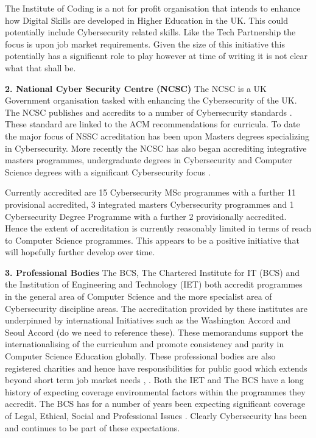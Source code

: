 \documentclass[sigconf]{acmart}
\begin{document}
The Institute of Coding is a not for profit organisation that intends to enhance how Digital Skills are developed in Higher Education in the UK. This could potentially include Cybersecurity related skills. Like the Tech Partnership the focus is upon job market requirements.  Given the size of this initiative this potentially has a significant role to play however at time of writing it is not clear what that shall be.

\textbf{2. National Cyber Security Centre (NCSC)}
The NCSC is a UK Government organisation tasked with enhancing the Cybersecurity of the UK. The NCSC publishes and accredits to a number of Cybersecurity standards \cite{NCCS2018a}. These standard are linked to the ACM recommendations for curricula. To date the major focus of NSSC acreditation has been upon Masters degrees specializing in Cybersecurity. More recently the NCSC has also began accrediting integrative masters programmes, undergraduate degrees in Cybersecurity and Computer Science degrees with a significant Cybersecurity focus \cite{NCCS2018b}.

Currently accredited are 15 Cybersecurity MSc programmes with a further 11 provisional accredited, 3 integrated masters Cybersecurity programmes and 1 Cybersecurity Degree Programme with a further 2 provisionally accredited. Hence the extent of accreditation is currently reasonably limited in terms of reach to Computer Science programmes. This appears to be a positive initiative that will hopefully further develop over time. 

\textbf{3. Professional Bodies}
The BCS, The Chartered Institute for IT (BCS) and the Institution of Engineering and Technology (IET) both accredit programmes in the general area of Computer Science and the more specialist area of Cybersecurity discipline areas. The accreditation provided by these institutes are underpinned by international Initiatives such as the Washington Accord and Seoul Accord (do we need to reference these). These memorandums support the internationalising of the curriculum and promote consistency and parity in Computer Science Education globally.   These professional bodies are also registered charities and hence have responsibilities for public good which extends beyond short term job market needs \cite{Stensaker2006}, \cite{Mutereko2017}. Both the IET and The BCS have a long history of expecting coverage environmental factors within the programmes they accredit. The BCS has for a number of years been expecting significant coverage of Legal, Ethical, Social and Professional Issues \cite{Brooke2018}. Clearly Cybersecurity has been and continues to be part of these expectations. 
\end{document}
